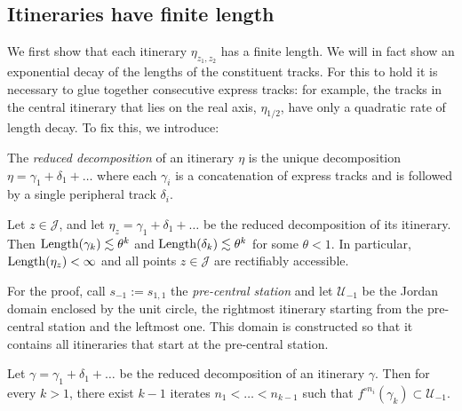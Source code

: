 \subsection{Itineraries have finite length}
We first show that each itinerary $\eta_{z_1,z_2}$ has a finite length. 
We will in fact show an exponential decay of the lengths of the constituent tracks. 
For this to hold it is necessary to glue together consecutive express tracks: 
for example, the tracks in the central itinerary that lies on the real axis, $\eta_{1/2}$, 
have only a quadratic rate of length decay. To fix this, we introduce:

\begin{definition}
	The \emph{reduced decomposition} of an itinerary $\eta$ is the unique decomposition $\eta=\gamma_1 + \delta_1 + \dots$ where each $\gamma_i$ is a concatenation of express tracks and is followed by a single peripheral track $\delta_i$.
\end{definition}

\begin{proposition} \label{prop:finite-length}
	Let $z \in \mathcal J$, and let $\eta_z= \gamma_1 + \delta_1 + \dots  $ be the reduced decomposition of its itinerary. Then $\operatorname{Length}(\gamma_k)\lesssim \theta^k$ and $\operatorname{Length}(\delta_k)\lesssim \theta^k$ for some $\theta < 1$. In particular, $\operatorname{Length}(\eta_z)<\infty$ and all points $z\mathcal \in \mathcal J$ are rectifiably accessible.
\end{proposition}

For the proof, call $s_{-1}:=s_{1,1}$ the \emph{pre-central station} and let $\mathcal U_{-1}$ be the Jordan domain enclosed by the unit circle, the rightmost itinerary starting from the pre-central station and the leftmost one. This domain is constructed so that it contains all itineraries that start at the pre-central station.  

\begin{lemma} \label{lemma-enough-visits-of-premain_station}
	Let $\gamma = \gamma_1 + \delta_1 + \dots $ be the reduced decomposition of an itinerary $\gamma$. Then for every $k > 1$, there exist $k-1$ iterates $n_1 < \dots < n_{k-1}$ such that $f^{\circ {n_i}}(\gamma_k) \subset \mathcal U_{-1}$. %
\end{lemma}

